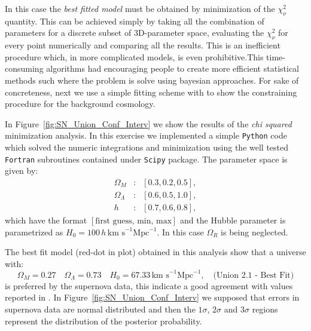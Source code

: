 \documentclass[12pt,letterpaper,twoside]{book}
\newcommand\etcomment[1]{\MakeUppercase{\mytexttt{\textcolor{blue}{#1}}}}
\begin{document}
In this case the \textit{best fitted model} must be obtained by minimization of
the $\chi^2_\nu$ quantity. This can be achieved simply by taking all the
combination of parameters for a discrete subset of 3D-parameter space,
evaluating the $\chi^2_\nu$ for every point numerically and comparing all the
results. This is an inefficient procedure which, in more complicated models, is
even prohibitive.\etcomment{Redundant with next paragraphs?}This time-consuming
algorithms had encouraging people to create more efficient statistical methods
such where the problem is solve using bayesian approaches. For sake of
concreteness, next we use a simple fitting scheme with to show the constraining
procedure for the background cosmology.

\etcomment{Describing our procedure.}In Figure~\ref{fig:SN_Union_Conf_Interv} we
show the results of the \textit{chi squared} minimization analysis. In this
exercise we implemented a simple \texttt{Python} code which solved the numeric
integrations and minimization using the well tested \texttt{Fortran} subroutines
contained under \texttt{Scipy} package. The parameter space is given by:
%
\begin{eqnarray}
    \Omega_M       & : & \left[0.3, 0.2, 0.5\right],\nonumber \\
    \Omega_\Lambda & : & \left[0.6, 0.5, 1.0\right],\nonumber\\
     h             & : & \left[0.7,0.6, 0.8 \right],\nonumber
\end{eqnarray}
%
which have the format $\left[\mbox{first guess, min, max} \right]$ and the
Hubble parameter is parametrized as ${H_0 = 100\,h\,\mbox{km s}^{-1}
    \mbox{Mpc}^{-1}}$. In this case $\Omega_R$ is being neglected.

The best fit model (red-dot in plot) obtained in this analysis show that a
universe with:
%
\begin{equation}
    \Omega_M = 0.27 \quad
    \Omega_\Lambda = 0.73 \quad
    H_0=67.33 \,\mbox{km s}^{-1} \mbox{Mpc}^{-1}, \quad
                                                  \mbox{(Union 2.1 - Best Fit)}
\end{equation}
%
is preferred by the supernova data, this indicate a good agreement with values
reported in \cite{Freedman:2000cf}. In Figure~\ref{fig:SN_Union_Conf_Interv} we
supposed that errors in supernova data are normal distributed and then the
$1\sigma$, $2\sigma$ and $3\sigma$ regions represent the distribution of the
posterior probability.
\end{document}
